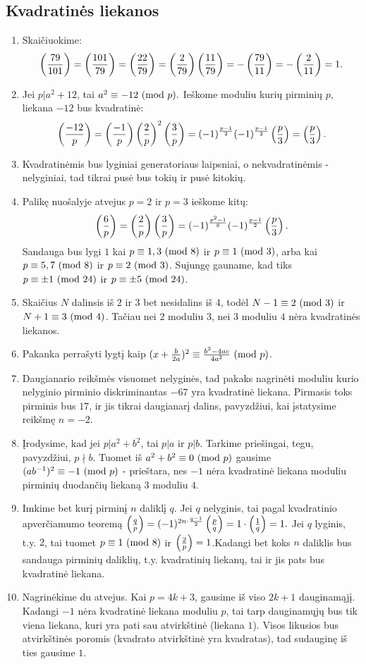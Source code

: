 \subsection*{Kvadratinės liekanos}
\begin{enumerate}
\item
    Skaičiuokime:$$\left(\frac{79}{101}\right) =\left(\frac{101}{79}\right) =\left(\frac{22}{79}\right)
    =\left(\frac{2}{79}\right)\left(\frac{11}{79}\right) =-\left(\frac{79}{11}\right) =-\left(\frac{2}{11}\right) = 1.$$
\item
    Jei $p|a^2 + 12$, tai $a^2 \equiv -12 \ (\text{mod } p).$ Ieškome moduliu kurių
    pirminių $p$, liekana $-12$ bus kvadratinė:
    $$\left(\frac{-12}{p}\right) = \left(\frac{-1}{p}\right)\left(\frac{2}{p}\right)^2\left(\frac{3}{p}\right) =
    (-1)^\frac{p-1}2(-1)^\frac{p-1}{2}\left(\frac{p}{3}\right) = \left(\frac{p}{3}\right).$$
\item
    Kvadratinėmis bus lyginiai generatoriaus laipsniai, o nekvadratinėmis -
    nelyginiai, tad tikrai pusė bus tokių ir pusė kitokių.
\item
    Palikę nuošalyje atvejus $p=2$ ir $p=3$ ieškome kitų:
    $$\left(\frac{6}{p}\right) = \left(\frac{2}{p}\right)\left(\frac{3}{p}\right) =
    (-1)^\frac{p^2-1}{8}(-1)^\frac{p-1}{2}\left(\frac{p}{3}\right).$$
    Sandauga bus lygi $1$ kai $p\equiv 1, 3 \ (\text{mod } 8)$ ir $p\equiv 1\ (\text{mod } 3)$,
    arba kai $p\equiv 5, 7 \ (\text{mod } 8)$ ir $p\equiv 2\ (\text{mod } 3)$. Sujungę gauname,
    kad tiks $p \equiv \pm 1 \ (\text{mod } 24)$ ir $p \equiv \pm 5\ (\text{mod } 24)$.
\item
    Skaičius $N$ dalinsis iš $2$ ir $3$ bet nesidalins iš $4$, todėl
    $N - 1 \equiv 2 \ (\text{mod } 3)$ ir $N+1 \equiv 3 \ (\text{mod } 4)$. Tačiau nei $2$ moduliu
    $3$, nei $3$ moduliu $4$ nėra kvadratinės liekanos.
\item
    Pakanka perrašyti lygtį kaip $(x+\frac{b}{2a})^2 \equiv
    \frac{b^2-4ac}{4a^2}\ (\text{mod } p)$.
\item
    Daugianario reikšmės visuomet nelyginės, tad pakaks nagrinėti moduliu
    kurio nelyginio pirminio diskriminantas $-67$ yra kvadratinė liekana.
    Pirmasis toks pirminis bus $17$, ir jis tikrai daugianarį dalins,
    pavyzdžiui, kai įstatysime reikšmę $n=-2$.
\item
    Įrodysime, kad jei $p|a^2 + b^2$, tai $p|a$ ir $p|b$. Tarkime
    priešingai, tegu, pavyzdžiui, $p\nmid b$. Tuomet iš $a^2 + b^2 \equiv 0\ (\text{mod } p)$
    gausime $(ab^{-1})^2\equiv -1 \ (\text{mod } p)$ - prieštara, nes $-1$ nėra
    kvadratinė liekana moduliu pirminių duodančių liekaną $3$ moduliu
    $4$.
\item
    Imkime bet kurį pirminį $n$ daliklį $q$. Jei $q$ nelyginis, tai pagal
    kvadratinio apverčiamumo teoremą $\left(\frac{q}{p}\right) = (-1)^{2n\cdot
    \frac{q-1}{2}} \left(\frac{p}{q}\right)= 1\cdot \left(\frac{1}{q}\right) = 1.$ Jei $q$ lyginis,
    t.y. $2$, tai tuomet $p \equiv 1 \ (\text{mod } 8)$ ir $\left(\frac{2}{p}\right) = 1$.Kadangi
    bet koks $n$ daliklis bus sandauga pirminių daliklių, t.y. kvadratinių
    liekanų, tai ir jis pats bus kvadratinė liekana.
\item
    Nagrinėkime du atvejus. Kai $p = 4k + 3$, gausime iš viso $2k + 1$
    dauginamąjį. Kadangi $-1$ nėra kvadratinė liekana moduliu $p$, tai
    tarp dauginamųjų bus tik viena liekana, kuri yra pati sau atvirkštinė
    (liekana $1$).  Visos likusios bus atvirkštinės poromis (kvadrato
    atvirkštinė yra kvadratas), tad sudauginę iš ties gausime $1$.
    

\end{enumerate}
